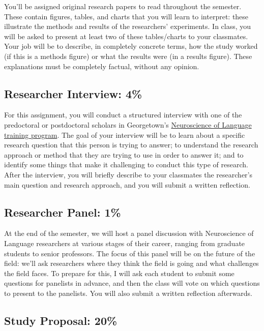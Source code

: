 \documentclass[
  letterpaper,
  DIV=11,
  numbers=noendperiod]{scrartcl}
\begin{document}
You'll be assigned original research papers to read throughout the
semester. These contain figures, tables, and charts that you will learn
to interpret: these illustrate the methods and results of the
researchers' experiments. In class, you will be asked to present at
least two of these tables/charts to your classmates. Your job will be to
describe, in completely concrete terms, how the study worked (if this is
a methods figure) or what the results were (in a results figure). These
explanations must be completely factual, without any opinion.

\subsection{\texorpdfstring{\textbf{Researcher Interview:
4\%}}{Researcher Interview: 4\%}}\label{researcher-interview-4}

For this assignment, you will conduct a structured interview with one of
the predoctoral or postdoctoral scholars in Georgetown's
\href{https://neurolang.georgetown.edu/}{Neuroscience of Language
training program}. The goal of your interview will be to learn about a
specific research question that this person is trying to answer; to
understand the research approach or method that they are trying to use
in order to answer it; and to identify some things that make it
challenging to conduct this type of research. After the interview, you
will briefly describe to your classmates the researcher's main question
and research approach, and you will submit a written reflection.

\subsection{\texorpdfstring{\textbf{Researcher Panel:
1\%}}{Researcher Panel: 1\%}}\label{researcher-panel-1}

At the end of the semester, we will host a panel discussion with
Neuroscience of Language researchers at various stages of their career,
ranging from graduate students to senior professors. The focus of this
panel will be on the future of the field: we'll ask researchers where
they think the field is going and what challenges the field faces. To
prepare for this, I will ask each student to submit some questions for
panelists in advance, and then the class will vote on which questions to
present to the panelists. You will also submit a written reflection
afterwards.

\subsection{\texorpdfstring{\textbf{Study Proposal:
20\%}}{Study Proposal: 20\%}}\label{study-proposal-20}
\end{document}
